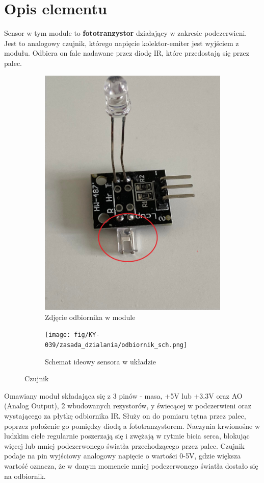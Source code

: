 \documentclass[11pt, a4paper]{article}
\author{Anna Nasierowska}
\begin{document}
\newpage

\section*{Opis elementu} 

Sensor w tym module to \textbf{fototranzystor} działający w zakresie podczerwieni. Jest to analogowy czujnik, którego napięcie kolektor-emiter jest wyjściem z modułu. Odbiera on fale nadawane przez diodę IR, które przedostają się przez palec. \\

\vspace{0.5cm}
\begin{figure}[h]
\centering
\begin{subfigure}{.5\textwidth}
  \centering
  \includegraphics[width=.5\linewidth]{fig/KY-039/zdj_modułu/zdj1.jpg}
  \caption{Zdjęcie odbiornika w module}
  \label{fig:sub1}
\end{subfigure}%
\begin{subfigure}{.5\textwidth}
  \centering
    \texttt{[image: fig/KY-039/zasada\_dzialania/odbiornik\_sch.png]}
      \caption{Schemat ideowy sensora w układzie}
  \label{zd}
\end{subfigure}
\caption{Czujnik}
\label{fig:test}
\end{figure}
\vspace{0.5cm}

Omawiany moduł składająca się z 3 pinów - masa, +5V lub +3.3V oraz AO (Analog Output), 2 wbudowanych rezystorów, y świecącej w podczerwieni oraz wystającego za płytkę odbiornika IR. Służy on do pomiaru tętna przez palec, poprzez położenie go pomiędzy diodą a fototranzystorem. Naczynia krwionośne w ludzkim ciele regularnie poszerzają się i zwężają w rytmie bicia serca, blokując więcej lub mniej podczerwonego światła przechodzącego przez palec. Czujnik podaje na pin wyjściowy analogowy napięcie o wartości 0-5V, gdzie większa wartość oznacza, że w danym momencie mniej podczerwonego światła dostało się na odbiornik. 
\end{document}
